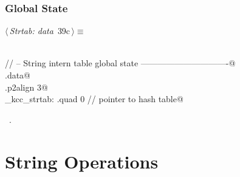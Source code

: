 \documentclass[11pt,a4paper,twoside,openright,DIV=15]{scrbook}
\theoremstyle{definition}
\theoremstyle{plain}
\theoremstyle{remark}
\begin{document}
\begin{flushleft}
\begin{minipage}{\linewidth}
\begin{list}{}{\setlength{\itemsep}{-\parsep}\setlength{\itemindent}{-\leftmargin}}
\item{}
\end{list}
\end{minipage}\vspace{4ex}
\end{flushleft}
\subsection{Global State}

\begin{flushleft} \small
\begin{minipage}{\linewidth}\label{scrap29}\raggedright\small
{} $\langle\,${\itshape Strtab: data}\nobreak\ {\footnotesize {39c}}$\,\rangle\equiv$
\vspace{-1ex}
\begin{list}{}{} \item
\mbox{}\verb@@\\
\mbox{}\verb@// -- String intern table global state -------------------------------@\\
\mbox{}\verb@.data@\\
\mbox{}\verb@.p2align 3@\\
\mbox{}\verb@_kcc_strtab: .quad 0             // pointer to hash table@\\
\mbox{}\verb@@{\NWsep}
\end{list}
\vspace{-1.5ex}
\footnotesize
\begin{list}{}{\setlength{\itemsep}{-\parsep}\setlength{\itemindent}{-\leftmargin}}
\item \NWtxtMacroRefIn\ .

\item{}
\end{list}
\end{minipage}\vspace{4ex}
\end{flushleft}
%
%

\chapter{String Operations}
\label{ch:strings}
\end{document}
